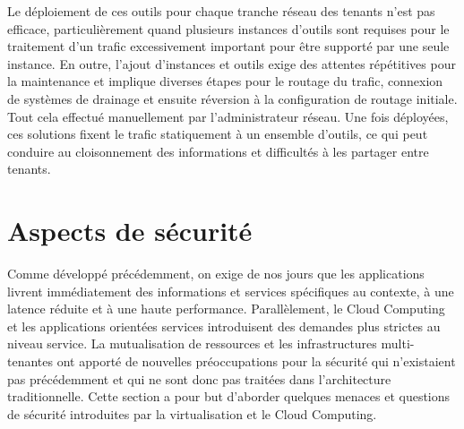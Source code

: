 Le déploiement de ces outils pour chaque tranche réseau des tenants n'est pas efficace, particulièrement quand plusieurs instances d'outils sont requises pour le traitement d'un trafic excessivement important pour être supporté par une seule instance. En outre, l'ajout d'instances et outils exige des attentes répétitives pour la maintenance et implique diverses étapes pour le routage du trafic, connexion de systèmes de drainage et ensuite réversion à la configuration de routage initiale. Tout cela effectué manuellement par l'administrateur réseau. Une fois déployées, ces solutions fixent le trafic statiquement à un ensemble d'outils, ce qui peut conduire au cloisonnement des informations et difficultés à les partager entre tenants. \cite{bigSwitchTapModernDC}







\section{Aspects de sécurité}

Comme développé précédemment, on exige de nos jours que les applications livrent immédiatement des informations et services spécifiques au contexte, à une latence réduite et à une haute performance. Parallèlement, le Cloud Computing et les applications orientées services introduisent des demandes plus strictes au niveau service. La mutualisation de ressources et les infrastructures multi-tenantes ont apporté de nouvelles préoccupations pour la sécurité qui n'existaient pas précédemment et qui ne sont donc pas traitées dans l'architecture traditionnelle. Cette section a pour but d'aborder quelques menaces et questions de sécurité introduites par la virtualisation et le Cloud Computing.

